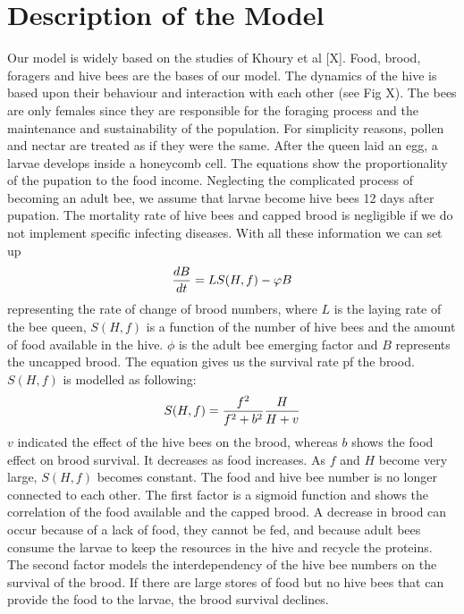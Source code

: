 \section{Description of the Model}
Our model is widely based on the studies of Khoury et al [X]. Food, brood, foragers and hive bees are the bases of our model. The dynamics of the hive is based upon their behaviour and interaction with each other (see Fig X). The bees are only females since they are responsible for the foraging process and the maintenance and sustainability of the population. For simplicity reasons, pollen and nectar are treated as if they were the same. After the queen laid an egg, a larvae develops inside a honeycomb cell. The equations show the proportionality of the pupation to the food income. Neglecting the complicated process of becoming an adult bee, we assume that larvae become hive bees 12 days after pupation. The mortality rate of hive bees and capped brood is negligible if we do not implement specific infecting diseases. With all these information we can set up
\begin{equation}\label{rate of change of brood numbers}
{dB \over dt} = LS(H,f)-\phi B
\end{equation}
representing the rate of change of brood numbers, where $L$ is the laying rate of the bee queen, $S(H,f)$ is a function of the number of hive bees and the amount of food available in the hive. $\phi$ is the adult bee emerging factor and $B$ represents the uncapped brood. The equation gives us the survival rate pf the brood. $S(H,f)$ is modelled as following:
\begin{equation}\label{function of hive bees and food}
S(H,f)={f^2 \over f^2+b^2}{H \over H+v}
\end{equation}
$v$ indicated the effect of the hive bees on the brood, whereas $b$ shows the food effect on brood survival. It decreases as food increases. As $f$ and $H$ become very large, $S(H,f)$ becomes constant. The food and hive bee number is no longer connected to each other. The first factor is a sigmoid function and shows the correlation of the food available and the capped brood. A decrease in brood can occur because of a lack of food, they cannot be fed, and because adult bees consume the larvae to keep the resources in the hive and recycle the proteins. The second factor models the interdependency of the hive bee numbers on the survival of the brood. If there are large stores of food but no hive bees that can provide the food to the larvae, the brood survival declines.  
\\
